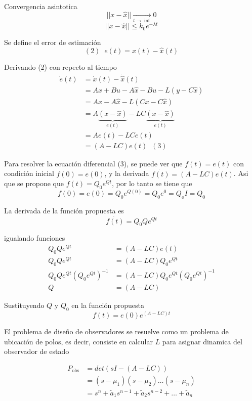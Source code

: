 Convergencia asintotica
\[
    ||x - \hat{x}||\underset{t \to \inf}{\to} 0
\]
\[
    ||x-\hat{x}|| \le k_{0} e^{-\lambda t}
\]

Se define el error de estimación 
\[
    (2) \;\; e(t) = x(t) -\hat{x}(t)
\]

Derivando (2) con repecto al tiempo
\[
    \begin{split}
        \dot{e}(t) & = \dot{x}(t) -\dot{\hat{x}}(t) \\
        & = Ax + Bu -A\hat{x} - Bu - L(y - C \hat{x}) \\
        & = Ax-A\hat{x}-L(Cx -C\hat{x})\\
        & = A
        \underbrace{(x-\hat{x})}_{e(t)} 
        - LC
        \underbrace{(x-\hat{x})}_{e(t)}\\
        & = Ae(t) - LCe(t) \\
        & = (A-LC)e(t) \;\; (3)
    \end{split}
\]

Para resolver la ecuación diferencial (3), se puede ver que \(f(t) = e(t)\) con condición inicial \(f(0) = e(0) \), y la derivada \( \dot{f(t)} = (A-LC)e(t) \). Asi que se propone que \( f(t) =Q_{0}e^{Qt} \), por lo tanto se tiene que
\[
    f(0) = e(0) = Q_{0}e^{Q(0)}=Q_{0}e^{0} = Q_{o}I = Q_{0}
\]

La derivada de la función propuesta es 
\[
    \dot{f(t)} = Q_{0}Qe^{Qt}
\]

igualando funciones
\[
    \begin{split}
        Q_{0}Qe^{Qt} & = (A-LC)e(t) \\
        Q_{0}Qe^{Qt} & = (A-LC)Q_{0}e^{Qt}\\
        Q_{0}Qe^{Qt}(Q_{0}e^{Qt})^{-1} & = (A-LC)Q_{0}e^{Qt}(Q_{0}e^{Qt})^{-1}\\
        Q & = (A-LC) 
    \end{split}
\]

Sustituyendo \( Q \) y \( Q_{0} \) en la función propuesta 
\[
    f(t) = e(0)e^{(A-LC)t}
\]

El problema de diseño de observadores se resuelve como un problema de ubicación de polos, es decir, consiste en calcular \( L \) para asignar dinamica del observador de estado

\[
    \begin{split}
        P_{\text{obs}} & = det(sI-(A-LC)) \\
        & = (s-\mu_{1})(s-\mu_{2})\ldots(s-\mu_{n}) \\
        & = s^{n} + \tilde{a}_{1}s^{n-1} + \tilde{a}_{2}s^{n-2} + \ldots + \tilde{a}_{n} 
    \end{split}
\]